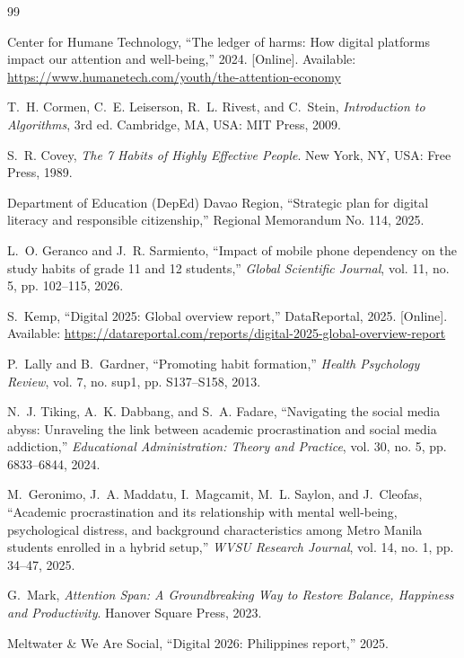 \documentclass[conference]{IEEEtran}
\begin{document}
\begin{thebibliography}{99}

Center for Humane Technology, ``The ledger of harms: How digital platforms impact our attention and well-being,'' 2024. [Online]. Available: \url{https://www.humanetech.com/youth/the-attention-economy}

T.~H. Cormen, C.~E. Leiserson, R.~L. Rivest, and C.~Stein, \emph{Introduction to Algorithms}, 3rd ed. Cambridge, MA, USA: MIT Press, 2009.

S.~R. Covey, \emph{The 7 Habits of Highly Effective People}. New York, NY, USA: Free Press, 1989. 

Department of Education (DepEd) Davao Region, ``Strategic plan for digital literacy and responsible citizenship,'' Regional Memorandum No. 114, 2025.

L.~O. Geranco and J.~R. Sarmiento, ``Impact of mobile phone dependency on the study habits of grade 11 and 12 students,'' \emph{Global Scientific Journal}, vol. 11, no. 5, pp. 102--115, 2026.

S.~Kemp, ``Digital 2025: Global overview report,'' DataReportal, 2025. [Online]. Available: \url{https://datareportal.com/reports/digital-2025-global-overview-report}

P.~Lally and B.~Gardner, ``Promoting habit formation,'' \emph{Health Psychology Review}, vol. 7, no. sup1, pp. S137--S158, 2013.

N.~J. Tiking, A.~K. Dabbang, and S.~A. Fadare, ``Navigating the social media abyss: Unraveling the link between academic procrastination and social media addiction,'' \emph{Educational Administration: Theory and Practice}, vol. 30, no. 5, pp. 6833--6844, 2024.

M.~Geronimo, J.~A. Maddatu, I.~Magcamit, M.~L. Saylon, and J.~Cleofas, ``Academic procrastination and its relationship with mental well-being, psychological distress, and background characteristics among Metro Manila students enrolled in a hybrid setup,'' \emph{WVSU Research Journal}, vol. 14, no. 1, pp. 34--47, 2025.

G.~Mark, \emph{Attention Span: A Groundbreaking Way to Restore Balance, Happiness and Productivity}. Hanover Square Press, 2023.

Meltwater \& We Are Social, ``Digital 2026: Philippines report,'' 2025.


\end{thebibliography}
\end{document}
